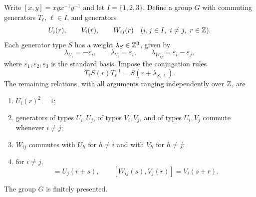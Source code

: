 Write $[x,y]=xyx^{-1}y^{-1}$ and let $I=\{1,2,3\}$.  Define a group
$G$ with commuting generators $T_\ell$, $\ell\in I$, and generators
\[
  U_i(r),\qquad V_i(r),\qquad W_{ij}(r)
  \quad(i,j\in I,\ i\neq j,\ r\in\mathbb Z).
\]
Each generator type $S$ has a weight $\lambda_S\in\mathbb Z^3$, given by
\begin{equation}
  \lambda_{U_i}=-\varepsilon_i,\qquad
  \lambda_{V_i}=\varepsilon_i,\qquad
  \lambda_{W_{ij}}=\varepsilon_i-\varepsilon_j,
  \label{eq:group-weights}
\end{equation}
where $\varepsilon_1,\varepsilon_2,\varepsilon_3$ is the standard basis.
Impose the conjugation rules
\begin{equation}
  T_\ell S(r)T_\ell^{-1}=S(r+\lambda_{S,\ell}).
  \label{eq:group-conjugation}
\end{equation}
The remaining relations, with all arguments ranging independently
over $\mathbb Z$, are
\begin{enumerate}
  \item $U_i(r)^2=1$;
  \item generators of types $U_i,U_j$, of types $V_i,V_j$, and of
    types $U_i,V_j$ commute whenever $i\neq j$;
  \item $W_{ij}$ commutes with $U_h$ for $h\neq i$ and with $V_h$
    for $h\neq j$;
  \item for $i\neq j$,
  \begin{equation}
    [U_i(r),W_{ij}(s)]=U_j(r+s),\qquad
    [W_{ij}(s),V_j(r)]=V_i(s+r).
    \label{eq:group-commutator-relations}
  \end{equation}
\end{enumerate}

\begin{lemma}
\label{lem:group-finite-presentation}
The group $G$ is finitely presented.
\end{lemma}

